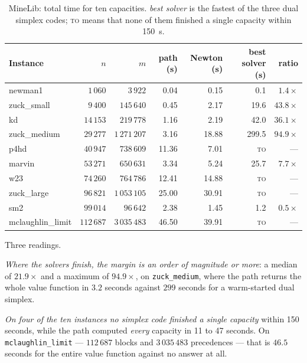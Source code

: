 \documentclass[11pt,a4paper]{article}
\newcommand{\code}[1]{\texttt{#1}}
\begin{document}
\begin{table}[htbp]
\centering
\caption{MineLib: total time for ten capacities. \emph{best solver} is the
fastest of the three dual simplex codes; \textsc{to} means that none of them
finished a single capacity within 150~s.}
\label{tab:minelib}
\begin{tabular}{lrrrrrr}
\toprule
Instance & $n$ & $m$ & path (s) & Newton (s) & best solver (s) & ratio\\
\midrule
newman1           & $1\,060$   & $3\,922$     & 0.04  & 0.15  & 0.1   & $1.4\times$\\
zuck\_small       & $9\,400$   & $145\,640$   & 0.45  & 2.17  & 19.6  & $43.8\times$\\
kd                & $14\,153$  & $219\,778$   & 1.16  & 2.19  & 42.0  & $36.1\times$\\
zuck\_medium      & $29\,277$  & $1\,271\,207$& 3.16  & 18.88 & 299.5 & $\mathbf{94.9\times}$\\
p4hd              & $40\,947$  & $738\,609$   & 11.36 & 7.01  & \textsc{to} & ---\\
marvin            & $53\,271$  & $650\,631$   & 3.34  & 5.24  & 25.7  & $7.7\times$\\
w23               & $74\,260$  & $764\,786$   & 12.41 & 14.88 & \textsc{to} & ---\\
zuck\_large       & $96\,821$  & $1\,053\,105$& 25.00 & 30.91 & \textsc{to} & ---\\
sm2               & $99\,014$  & $96\,642$    & 2.38  & 1.45  & 1.2   & $0.5\times$\\
mclaughlin\_limit & $112\,687$ & $3\,035\,483$& 46.50 & 39.91 & \textsc{to} & ---\\
\bottomrule
\end{tabular}
\end{table}

Three readings.

\emph{Where the solvers finish, the margin is an order of magnitude or more}:
a median of $21.9\times$ and a maximum of $94.9\times$, on \code{zuck\_medium},
where the path returns the whole value function in $3.2$ seconds against
$299$ seconds for a warm-started dual simplex.

\emph{On four of the ten instances no simplex code finished a single
capacity} within 150 seconds, while the path computed \emph{every} capacity
in 11 to 47 seconds. On \code{mclaughlin\_limit} --- $112\,687$ blocks and
$3\,035\,483$ precedences --- that is $46.5$ seconds for the entire value
function against no answer at all.
\end{document}
